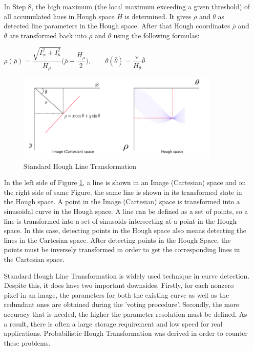 In Step 8, the high maximum (the local maximum exceeding a given threshold) of all accumulated lines in Hough space $H$ is determined. It gives $\overline{\rho}$ and $\overline{\theta}$ as detected line parameters in the Hough space. After that Hough coordinates $\overline{\rho}$ and $\overline{\theta}$ are transformed back into $\rho$ and $\theta$ using the following formulas\cite{Standard_Hough}:   
  
 \begin{center}

$ \rho(\overline{\rho}) = \dfrac{\sqrt{I^{2}_{w} + I^{2}_{h} }}{H_{\rho}} \bigg(\overline{\rho}-\dfrac{H_{\rho}}{2}\bigg)   ,  \qquad              \theta(\overline{\theta})=\dfrac{\pi}{H_{\theta}}\overline{\theta} $
 
 \end{center}
 
 \begin{figure}[H]
 \centering
  \includegraphics[width=0.9\textwidth]{./Bilder/Standard_Hough_Line_Transformation.png}
  \caption{Standard Hough Line Transformation\cite{Standard_Hough_Transformation}}
  \label{Standard_Hough_Line_Transformation_fig}
\end{figure}
 
 In the left side of Figure \ref{Standard_Hough_Line_Transformation_fig}, a line is shown in an Image (Cartesian) space and on the right side of same Figure, the same line is shown in its transformed state in the Hough space. A point in the Image (Cartesian) space is transformed into a sinusoidal curve in the Hough space. A line can be defined as a set of points, so a line is transformed into a set of sinusoids intersecting at a point in the Hough space. In this case, detecting points in the Hough space also means detecting the lines in the Cartesian space. After detecting points in the Hough Space, the points must be inversely transformed in order to get the corresponding lines in the Cartesian space.
 
Standard Hough Line Transformation is widely used technique in curve detection. Despite this, it does have two important downsides. Firstly, for each nonzero pixel in an image, the parameters for both the existing curve as well as the redundant ones are obtained during the 'voting procedure'. Secondly, the more accuracy that is needed, the higher the parameter resolution must be defined. As a result, there is often a large storage requirement and low speed for real applications. Probabilistic Hough Transformation was derived in order to counter these problems. 

